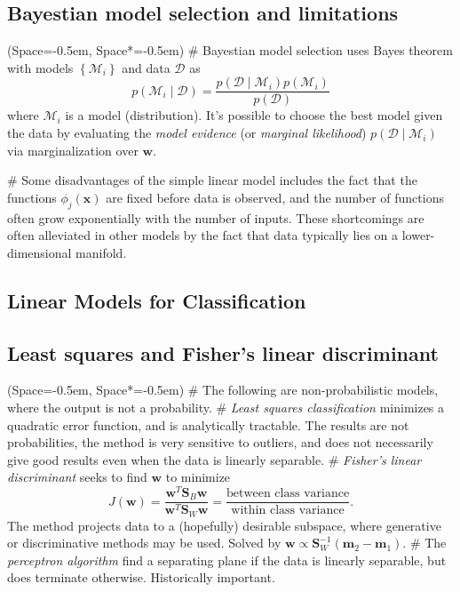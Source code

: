 \documentclass[12pt, a4paper]{article}
\newcommand{\listSpace}{-0.5em}%
\newcommand{\D}{\mathcal{D}}
\newcommand{\vect}[1]{\bm{#1}}
\begin{document}
\subsection*{Bayestian model selection and limitations}
\begin{easylist}[itemize]
	\ListProperties(Space=\listSpace, Space*=\listSpace)
	# Bayestian model selection uses Bayes theorem with models $\left\{ \mathcal{M}_i \right\}$ and data $\D$ as
	\begin{equation*}
		p( \mathcal{M}_i \mid \D) = \frac{p( \D \mid \mathcal{M}_i) p( \mathcal{M}_i )}{p( \D)}
	\end{equation*}
	where $\mathcal{M}_i$ is a model (distribution).
	It's possible to choose the best model given the data by evaluating the \emph{model evidence} (or \emph{marginal likelihood}) $p( \D \mid \mathcal{M}_i)$ via marginalization over $\vect{w}$.
	
	# Some disadvantages of the simple linear model includes the fact that the functions $\phi_j(\vect{x})$ are fixed before data is observed, and the number of functions often grow exponentially with the number of inputs.
	These shortcomings are often alleviated in other models by the fact that data typically lies on a lower-dimensional manifold.
\end{easylist}

\subsection{Linear Models for Classification}

\subsection*{Least squares and Fisher's linear discriminant}
\begin{easylist}[itemize]
	\ListProperties(Space=\listSpace, Space*=\listSpace)
	# The following are non-probabilistic models, where the output is not a probability.
	# \emph{Least squares classification} minimizes a quadratic error function, and is analytically tractable.
	The results are not probabilities, the method is very sensitive to outliers, and does not necessarily give good results even when the data is linearly separable.
	# \emph{Fisher's linear discriminant} seeks to find $\vect{w}$ to minimize
	\begin{equation*}
		J(\vect{w}) = 
		\frac{\vect{w}^T \vect{S}_{B} \vect{w}}{\vect{w}^T \vect{S}_{W} \vect{w}}
		= 
		\frac{\text{between class variance}}{\text{within class variance}}.
	\end{equation*}
	The method projects data to a (hopefully) desirable subspace, where generative or discriminative methods may be used.
	Solved by $\vect{w} \propto \vect{S}_{W}^{-1} \left( \vect{m}_2 - \vect{m}_1 \right)$.
	# The \emph{perceptron algorithm} find a separating plane if the data is linearly separable, but does terminate otherwise.
	Historically important.
\end{easylist}
\end{document}
